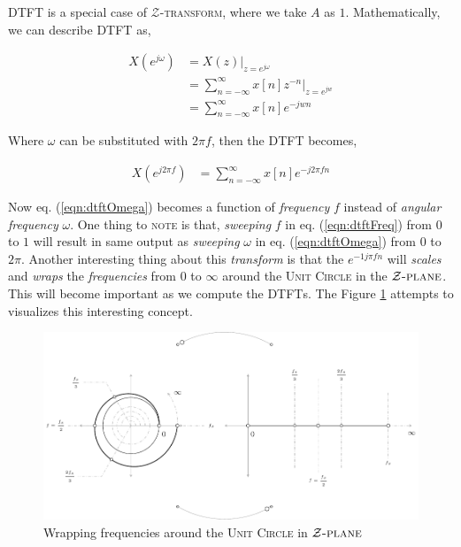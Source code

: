 \documentclass[../../course]{subfiles}
\begin{document}
\textsc{DTFT} is a special case of $\mathcal{Z}$\textsc{-transform}, where we take $A$
as $1$. Mathematically, we can describe \textsc{DTFT} as,

\begin{align}
    X(e^{j \omega}) &= X(z) |_{z = e^{j \omega}} \\
    &= \sum_{n = - \infty}^{\infty} x[n] z^{-n} \Big|_{z = e^{jw}} \\
    &= \sum_{n = - \infty}^{\infty} x[n] e^{-j w n} \label{eqn:dtftOmega}
\end{align}

Where $\omega$ can be substituted with $2 \pi f$, then the \textsc{DTFT} becomes,

\begin{align}
    X(e^{j 2 \pi f}) &= \sum_{n = - \infty}^{\infty} x[n] e^{-j 2 \pi f n}
    \label{eqn:dtftFreq}
\end{align}

Now eq. (\ref{eqn:dtftOmega}) becomes a function of \emph{frequency} $f$
instead of \emph{angular frequency} $\omega$. One thing to \textsc{note} is that,
\emph{sweeping} $f$ in eq. (\ref{eqn:dtftFreq}) from $0$ to $1$ will result in same
output as \emph{sweeping} $\omega$ in eq. (\ref{eqn:dtftOmega}) from $0$ to $2 \pi$.
Another interesting thing about this \emph{transform} is that the $e^{-1j \pi f n}$ will
\emph{scales} and \emph{wraps} the \emph{frequencies} from $0$ to $\infty$ around
the \textsc{Unit Circle} in the $\mathcal{Z} \textsc{-plane}$. This will become
important as we compute the \textsc{DTFT}s. The Figure \ref{fig:wrapFreqUnitCircle}
attempts to visualizes this interesting concept.

\begin{figure}
    \centering
     {
        \includegraphics[height = 1\textheight] {tikzpics/epicWrapFreqUnitCircle.pdf}
    }
     {
        Wrapping frequencies around the \textsc{Unit Circle} in $\mathcal{Z}\textsc{-plane}$
    }
    \label{fig:wrapFreqUnitCircle}
\end{figure}
\end{document}
